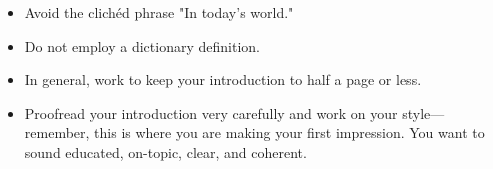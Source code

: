 \begin{itemize}
\item Avoid the clich\'ed phrase "In today's world."
        	
\item Do not employ a dictionary definition.
       	
\item In general, work to keep your introduction to half a page or less.    	  
 
\item Proofread your introduction very carefully and work on your style---remember, 
this is where you are making your first impression. You want to sound educated, 
on-topic, clear, and coherent.
 \end{itemize}
 
